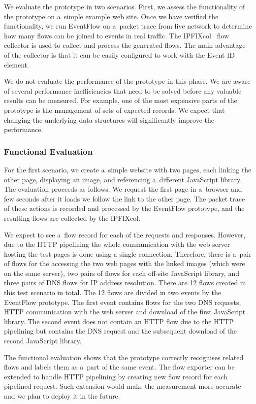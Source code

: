 We evaluate the prototype in two scenarios. First, we assess the functionality of the prototype on a~simple example web site. Once we have verified the functionality, we run EventFlow on a~packet trace from live network to determine how many flows can be joined to events in real traffic. The IPFIXcol~\cite{Velan-2012-Flow} flow collector is used to collect and process the generated flows. The main advantage of the collector is that it can be easily configured to work with the Event ID element.

We do not evaluate the performance of the prototype in this phase. We are aware of several performance inefficiencies that need to be solved before any valuable results can be measured. For example, one of the most expensive parts of the prototype is the management of sets of expected records. We expect that changing the underlying data structures will significantly improve the performance.

\subsubsection{Functional Evaluation}
For the first scenario, we create a~simple website with two pages, each linking the other page, displaying an image, and referencing a~different JavaScript library. The evaluation proceeds as follows. We request the first page in a~browser and few seconds after it loads we follow the link to the other page. The packet trace of these actions is recorded and processed by the EventFlow prototype, and the resulting flows are collected by the IPFIXcol.

We expect to see a~flow record for each of the requests and responses. However, due to the HTTP pipelining the whole communication with the web server hosting the test pages is done using a single connection. Therefore, there is a~pair of flows for the accessing the two web pages with the linked images (which were on the same server), two pairs of flows for each off-site JavaScript library, and three pairs of DNS flows for IP address resolution. There are 12 flows created in this test scenario in total. The 12 flows are divided in two events by the EventFlow prototype. The first event contains flows for the two DNS requests, HTTP communication with the web server and download of the first JavaScript library. The second event does not contain an HTTP flow due to the HTTP pipelining but contains the DNS request and the subsequent download of the second JavaScript library.

The functional evaluation shows that the prototype correctly recognises related flows and labels them as a~part of the same event. The flow exporter can be extended to handle HTTP pipelining by creating new flow record for each pipelined request. Such extension would make the measurement more accurate and we plan to deploy it in the future.

